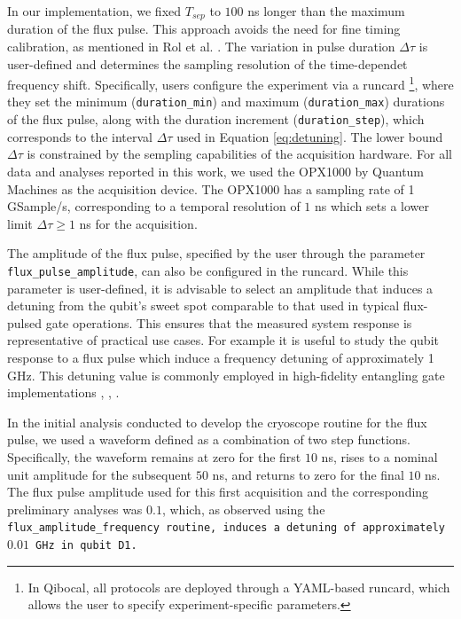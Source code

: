 In our implementation, we fixed $T_{sep}$ to $100$ ns longer than the maximum duration of the flux pulse.
This approach avoids the need for fine timing calibration, as mentioned in Rol et al. \cite{rol_time-domain_2020}.
The variation in pulse duration $\Delta\tau$ is user-defined and determines the sampling resolution of the time-dependet frequency shift.
Specifically, users configure the experiment via a runcard \footnote{In Qibocal, all protocols are deployed through a YAML-based runcard, which allows the user to specify experiment-specific parameters.},
where they set the minimum (\texttt{duration\_min}) and maximum (\texttt{duration\_max}) durations of the flux pulse, along with the duration increment (\texttt{duration\_step}), which corresponds to the interval $\Delta\tau$ used in Equation \ref{eq:detuning}.
The lower bound $\Delta\tau$ is constrained by the sempling capabilities of the acquisition hardware.
For all data and analyses reported in this work, we used the OPX1000 by Quantum Machines \cite{opx1000} as the acquisition device. 
The OPX1000 has a sampling rate of 1 GSample/s, corresponding to a temporal resolution of $1$ ns which sets a lower limit $\Delta\tau \geq 1$ ns for the acquisition.

The amplitude of the flux pulse, specified by the user through the parameter \texttt{flux\_pulse\_amplitude}, can also be configured in the runcard. 
While this parameter is user-defined, it is advisable to select an amplitude that induces a detuning from the qubit's sweet spot comparable to that used in typical flux-pulsed gate operations. 
This ensures that the measured system response is representative of practical use cases.
For example it is useful to study the qubit response to a flux pulse which induce a frequency detuning of approximately 1 GHz. 
This detuning value is commonly employed in high-fidelity entangling gate implementations \cite{Langford2017}, \cite{Bultink_2020}, \cite{Rol2019iju}.

In the initial analysis conducted to develop the cryoscope routine for the flux pulse, we used a waveform defined as a combination of two step functions. 
Specifically, the waveform remains at zero for the first $10$ ns, rises to a nominal unit amplitude for the subsequent $50$ ns, and returns to zero for the final $10$ ns.
The flux pulse amplitude used for this first acquisition and the corresponding preliminary analyses was $0.1$, which, as observed using the \tt{flux\_amplitude\_frequency} routine, induces a detuning of approximately $0.01$ GHz in qubit \tt{D1}. 

